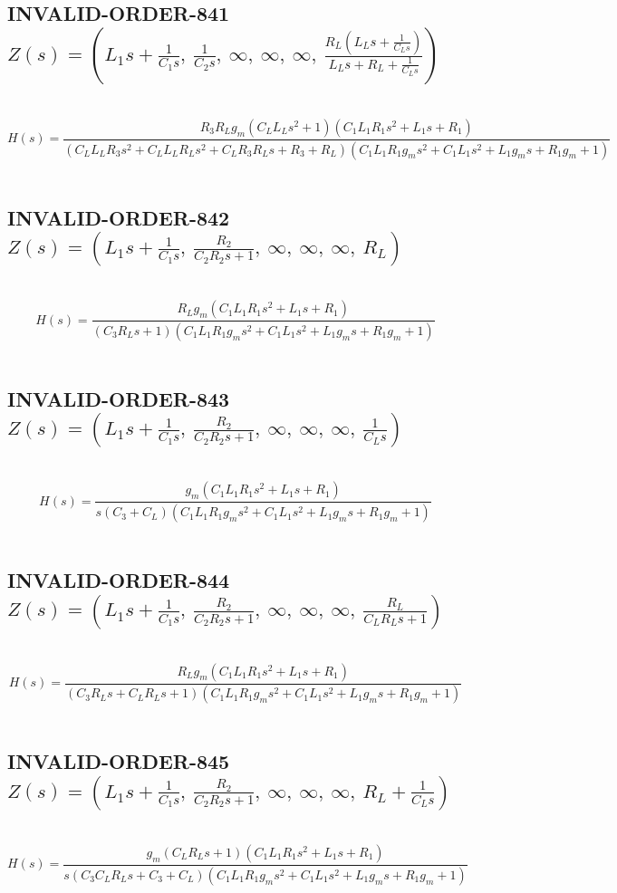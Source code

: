\documentclass{article}
\begin{document}
\subsection{INVALID-ORDER-841 $Z(s) = \left( L_{1} s + \frac{1}{C_{1} s}, \  \frac{1}{C_{2} s}, \  \infty, \  \infty, \  \infty, \  \frac{R_{L} \left(L_{L} s + \frac{1}{C_{L} s}\right)}{L_{L} s + R_{L} + \frac{1}{C_{L} s}}\right)$ } \ 
\textbf{\[H(s) = \frac{R_{3} R_{L} g_{m} \left(C_{L} L_{L} s^{2} + 1\right) \left(C_{1} L_{1} R_{1} s^{2} + L_{1} s + R_{1}\right)}{\left(C_{L} L_{L} R_{3} s^{2} + C_{L} L_{L} R_{L} s^{2} + C_{L} R_{3} R_{L} s + R_{3} + R_{L}\right) \left(C_{1} L_{1} R_{1} g_{m} s^{2} + C_{1} L_{1} s^{2} + L_{1} g_{m} s + R_{1} g_{m} + 1\right)}\] } \ 
\subsection{INVALID-ORDER-842 $Z(s) = \left( L_{1} s + \frac{1}{C_{1} s}, \  \frac{R_{2}}{C_{2} R_{2} s + 1}, \  \infty, \  \infty, \  \infty, \  R_{L}\right)$ } \ 
\textbf{\[H(s) = \frac{R_{L} g_{m} \left(C_{1} L_{1} R_{1} s^{2} + L_{1} s + R_{1}\right)}{\left(C_{3} R_{L} s + 1\right) \left(C_{1} L_{1} R_{1} g_{m} s^{2} + C_{1} L_{1} s^{2} + L_{1} g_{m} s + R_{1} g_{m} + 1\right)}\] } \ 
\subsection{INVALID-ORDER-843 $Z(s) = \left( L_{1} s + \frac{1}{C_{1} s}, \  \frac{R_{2}}{C_{2} R_{2} s + 1}, \  \infty, \  \infty, \  \infty, \  \frac{1}{C_{L} s}\right)$ } \ 
\textbf{\[H(s) = \frac{g_{m} \left(C_{1} L_{1} R_{1} s^{2} + L_{1} s + R_{1}\right)}{s \left(C_{3} + C_{L}\right) \left(C_{1} L_{1} R_{1} g_{m} s^{2} + C_{1} L_{1} s^{2} + L_{1} g_{m} s + R_{1} g_{m} + 1\right)}\] } \ 
\subsection{INVALID-ORDER-844 $Z(s) = \left( L_{1} s + \frac{1}{C_{1} s}, \  \frac{R_{2}}{C_{2} R_{2} s + 1}, \  \infty, \  \infty, \  \infty, \  \frac{R_{L}}{C_{L} R_{L} s + 1}\right)$ } \ 
\textbf{\[H(s) = \frac{R_{L} g_{m} \left(C_{1} L_{1} R_{1} s^{2} + L_{1} s + R_{1}\right)}{\left(C_{3} R_{L} s + C_{L} R_{L} s + 1\right) \left(C_{1} L_{1} R_{1} g_{m} s^{2} + C_{1} L_{1} s^{2} + L_{1} g_{m} s + R_{1} g_{m} + 1\right)}\] } \ 
\subsection{INVALID-ORDER-845 $Z(s) = \left( L_{1} s + \frac{1}{C_{1} s}, \  \frac{R_{2}}{C_{2} R_{2} s + 1}, \  \infty, \  \infty, \  \infty, \  R_{L} + \frac{1}{C_{L} s}\right)$ } \ 
\textbf{\[H(s) = \frac{g_{m} \left(C_{L} R_{L} s + 1\right) \left(C_{1} L_{1} R_{1} s^{2} + L_{1} s + R_{1}\right)}{s \left(C_{3} C_{L} R_{L} s + C_{3} + C_{L}\right) \left(C_{1} L_{1} R_{1} g_{m} s^{2} + C_{1} L_{1} s^{2} + L_{1} g_{m} s + R_{1} g_{m} + 1\right)}\] } \ 
\end{document}
